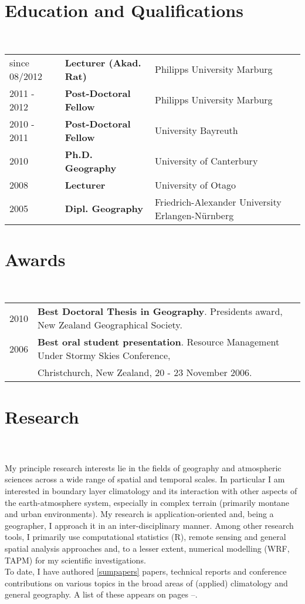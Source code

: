 \documentclass[a4paper,11pt]{article}
\begin{document}
\maketitle
\section{Education and Qualifications}
\hrulefill \\
\begin{tabular}{lll}\\
since 08/2012 & \textbf{Lecturer (Akad. Rat)} & Philipps University Marburg\\
2011 - 2012 & \textbf{Post-Doctoral Fellow} & Philipps University Marburg\\
2010 - 2011 & \textbf{Post-Doctoral Fellow} & University Bayreuth\\
2010 & \textbf{Ph.D. Geography} & University of Canterbury\\
2008 & \textbf{Lecturer} & University of Otago\\
2005 & \textbf{Dipl. Geography} & Friedrich-Alexander University Erlangen-N\"urnberg
\end{tabular}

\section{Awards}
\hrulefill \\
\begin{tabular}{lll}\\
2010 & \textbf{Best Doctoral Thesis in Geography}. Presidents award, New Zealand Geographical Society.\\
2006 & \textbf{Best oral student presentation}. Resource Management Under Stormy Skies Conference, \\
	 & Christchurch, New Zealand, 20 - 23 November 2006.
\end{tabular}

\section{Research}
\hrulefill \\
\hfill \\
My principle research interests lie in the fields of geography and atmospheric sciences across a wide range of spatial and temporal scales. In particular I am interested in boundary layer climatology and its interaction with other aspects of the earth-atmosphere system, especially in complex terrain (primarily montane and urban environments). My research is application-oriented and, being a geographer, I approach it in an inter-disciplinary manner. Among other research tools, I primarily use computational statistics (R), remote sensing and general spatial analysis approaches and, to a lesser extent, numerical modelling (WRF, TAPM) for my scientific investigations.\\
To date, I have authored \ref{sumpapers} papers, technical reports and conference contributions on various topics in the broad areas of (applied) climatology and general geography. A list of these appears on pages \pageref{papersstart}--\pageref{papersend}.
\end{document}
